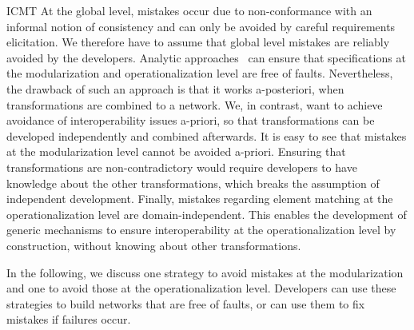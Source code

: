 \begin{copiedFrom}{ICMT}
At the global level, mistakes occur due to non-conformance with an informal notion of consistency and %
can only be avoided by careful requirements elicitation. 
We therefore have to assume that global level mistakes are reliably avoided by the developers.
Analytic approaches~\cite{klare2018docsym}
can ensure that specifications at the modularization and operationalization level are free of faults.
Nevertheless, %
the drawback of such an approach is that it works a-posteriori, when transformations are combined to a network. %
We, in contrast, want to achieve avoidance of interoperability issues a-priori, so that transformations can be developed independently and combined afterwards.
It is easy to see that mistakes at the modularization level cannot be avoided a-priori. 
Ensuring that transformations are non-contradictory %
would require developers to have knowledge about the other transformations, which breaks the assumption of independent development.
%
Finally, mistakes regarding element matching at the operationalization level are domain-independent. 
This enables the development of generic mechanisms to ensure interoperability at the operationalization level by construction, without knowing about other transformations.

In the following, we discuss one strategy to avoid mistakes at the modularization and one to avoid those at the operationalization level.
Developers can use these strategies to build networks that are free of faults, or can use them to fix mistakes if failures occur.



\end{copiedFrom}

